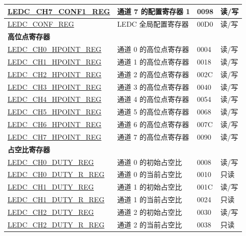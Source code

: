 \begin{longtable}{ | p{6cm} | p{7.2cm} | p{1.3cm} | p{1cm} | }
\hyperref[regdesc:LEDCCHNCONF1REG]{LEDC\_CH7\_CONF1\_REG} & 通道 7 的配置寄存器 1 & \hexprefix{}0098 & 读/写 \\ \hline
\hyperref[regdesc:LEDCCONFREG]{LEDC\_CONF\_REG} & LEDC 全局配置寄存器 & \hexprefix{}00D0 & 读/写 \\ \hline
\multicolumn{4}{|l|}{\textbf{高位点寄存器}} \\ \hline
\hyperref[regdesc:LEDCCHNHPOINTREG]{LEDC\_CH0\_HPOINT\_REG} & 通道 0 的高位点寄存器 & \hexprefix{}0004 & 读/写 \\ \hline
\hyperref[regdesc:LEDCCHNHPOINTREG]{LEDC\_CH1\_HPOINT\_REG} & 通道 1 的高位点寄存器 & \hexprefix{}0018 & 读/写 \\ \hline
\hyperref[regdesc:LEDCCHNHPOINTREG]{LEDC\_CH2\_HPOINT\_REG} & 通道 2 的高位点寄存器 & \hexprefix{}002C & 读/写 \\ \hline
\hyperref[regdesc:LEDCCHNHPOINTREG]{LEDC\_CH3\_HPOINT\_REG} & 通道 3 的高位点寄存器 & \hexprefix{}0040 & 读/写 \\ \hline
\hyperref[regdesc:LEDCCHNHPOINTREG]{LEDC\_CH4\_HPOINT\_REG} & 通道 4 的高位点寄存器 & \hexprefix{}0054 & 读/写 \\ \hline
\hyperref[regdesc:LEDCCHNHPOINTREG]{LEDC\_CH5\_HPOINT\_REG} & 通道 5 的高位点寄存器 & \hexprefix{}0068 & 读/写 \\ \hline
\hyperref[regdesc:LEDCCHNHPOINTREG]{LEDC\_CH6\_HPOINT\_REG} & 通道 6 的高位点寄存器 & \hexprefix{}007C & 读/写 \\ \hline
\hyperref[regdesc:LEDCCHNHPOINTREG]{LEDC\_CH7\_HPOINT\_REG} & 通道 7 的高位点寄存器 & \hexprefix{}0090 & 读/写 \\ \hline
\multicolumn{4}{|l|}{\textbf{占空比寄存器}} \\ \hline
\hyperref[regdesc:LEDCCHNDUTYREG]{LEDC\_CH0\_DUTY\_REG} & 通道 0 的初始占空比 & \hexprefix{}0008 & 读/写 \\ \hline
\hyperref[regdesc:LEDCCHNDUTYRREG]{LEDC\_CH0\_DUTY\_R\_REG} & 通道 0 的当前占空比 & \hexprefix{}0010 & 只读 \\ \hline
\hyperref[regdesc:LEDCCHNDUTYREG]{LEDC\_CH1\_DUTY\_REG} & 通道 1 的初始占空比 & \hexprefix{}001C & 读/写 \\ \hline
\hyperref[regdesc:LEDCCHNDUTYRREG]{LEDC\_CH1\_DUTY\_R\_REG} & 通道 1 的当前占空比 & \hexprefix{}0024 & 只读 \\ \hline
\hyperref[regdesc:LEDCCHNDUTYREG]{LEDC\_CH2\_DUTY\_REG} & 通道 2 的初始占空比 & \hexprefix{}0030 & 读/写 \\ \hline
\hyperref[regdesc:LEDCCHNDUTYRREG]{LEDC\_CH2\_DUTY\_R\_REG} & 通道 2 的当前占空比 & \hexprefix{}0038 & 只读 \\ \hline

\end{longtable}
